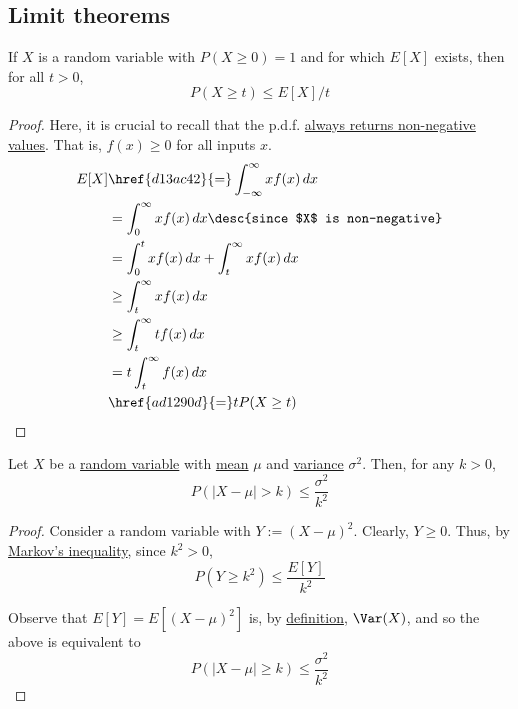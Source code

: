 \subsection{Limit theorems}\label{f04466e}

\label{dcc34d6}

If $X$ is a random variable with $P(X\geq0)=1$ and for which $E[X]$ exists,
then for all $t>0$,
$$
  P(X\geq t)\leq E[X]/t
$$

\begin{proof}
  Here, it is crucial to recall that the p.d.f. \href{cb9d3f0}{always returns
  non-negative values}. That is, $f(x)\geq0$ for all inputs $x$.
  \begin{align*}
    E[X] &\href{d13ac42}{=}\int_{-\infty}^\infty xf(x)\,dx         \\
         &=\int_0^\infty xf(x)\,dx\desc{since $X$ is non-negative} \\
         &=\int_0^txf(x)\,dx+\int_t^\infty xf(x)\,dx               \\
         &\geq\int_t^\infty xf(x)\,dx                              \\
         &\geq\int_t^\infty tf(x)\,dx                              \\
         &=t\int_t^\infty f(x)\,dx                                 \\
         &\href{ad1290d}{=}tP(X\geq t)
  \end{align*}
\end{proof}

\label{bd91f98}

Let $X$ be a \href{b96960b}{random variable} with \href{d13ac42}{mean} $\mu$
and \href{ddd95d5}{variance} $\sigma^2$. Then, for any $k>0$,
$$
  P(|X-\mu|>k)\leq\frac{\sigma^2}{k^2}
$$

\begin{proof}
  Consider a random variable with $Y:=(X-\mu)^2$. Clearly, $Y\geq0$. Thus, by
  \href{dcc34d6}{Markov's inequality}, since $k^2>0$,
  $$
    P(Y\geq k^2)\leq\frac{E[Y]}{k^2}
  $$

  Observe that $E[Y]=E[(X-\mu)^2]$ is, by \href{ddd95d5}{definition},
  $\Var(X)$, and so the above is equivalent to
  $$
    P(|X-\mu|\geq k)\leq\frac{\sigma^2}{k^2}
  $$
\end{proof}
